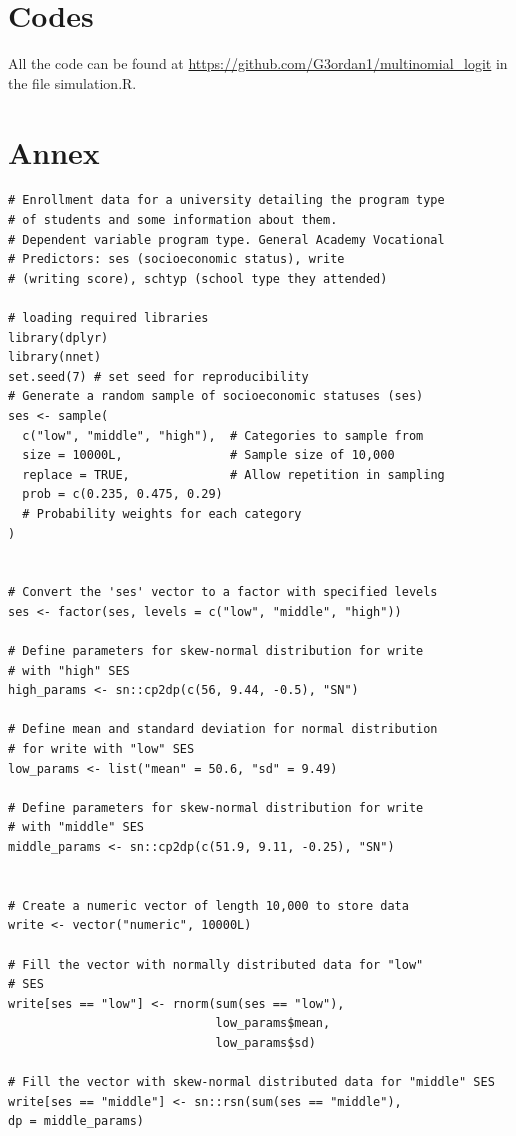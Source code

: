 \documentclass[12pt]{article}
\begin{document}
\section*{Codes}
All the code can be found at \url{https://github.com/G3ordan1/multinomial_logit} in the file simulation.R.

\printbibliography

\section*{Annex}
\begin{lstlisting}
# Enrollment data for a university detailing the program type 
# of students and some information about them.
# Dependent variable program type. General Academy Vocational
# Predictors: ses (socioeconomic status), write 
# (writing score), schtyp (school type they attended)

# loading required libraries
library(dplyr)
library(nnet)
set.seed(7) # set seed for reproducibility
# Generate a random sample of socioeconomic statuses (ses)
ses <- sample( 
  c("low", "middle", "high"),  # Categories to sample from
  size = 10000L,               # Sample size of 10,000
  replace = TRUE,              # Allow repetition in sampling
  prob = c(0.235, 0.475, 0.29) 
  # Probability weights for each category
)


# Convert the 'ses' vector to a factor with specified levels
ses <- factor(ses, levels = c("low", "middle", "high"))

# Define parameters for skew-normal distribution for write 
# with "high" SES
high_params <- sn::cp2dp(c(56, 9.44, -0.5), "SN")

# Define mean and standard deviation for normal distribution 
# for write with "low" SES
low_params <- list("mean" = 50.6, "sd" = 9.49)

# Define parameters for skew-normal distribution for write 
# with "middle" SES
middle_params <- sn::cp2dp(c(51.9, 9.11, -0.25), "SN")


# Create a numeric vector of length 10,000 to store data
write <- vector("numeric", 10000L)

# Fill the vector with normally distributed data for "low"
# SES
write[ses == "low"] <- rnorm(sum(ses == "low"), 
                             low_params$mean,
                             low_params$sd)

# Fill the vector with skew-normal distributed data for "middle" SES
write[ses == "middle"] <- sn::rsn(sum(ses == "middle"), 
dp = middle_params)


\end{lstlisting}
\end{document}
